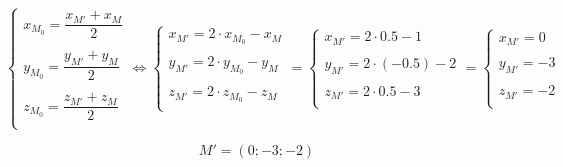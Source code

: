 $$
\begin{cases}
  x_{M_0} = \dfrac{x_{M'}+x_M}{2} \\
  \\
  y_{M_0} = \dfrac{y_{M'}+y_M}{2} \\
  \\
  z_{M_0} = \dfrac{z_{M'}+z_M}{2} \\
\end{cases} \iff
\begin{cases}
  x_{M'} = 2 \cdot x_{M_0} - x_M \\
  \\
  y_{M'} = 2 \cdot y_{M_0} - y_M \\
  \\
  z_{M'} = 2 \cdot z_{M_0} - z_M \\
\end{cases} =
\begin{cases}
  x_{M'} = 2 \cdot 0.5 - 1 \\
  \\
  y_{M'} = 2 \cdot (-0.5) - 2 \\
  \\
  z_{M'} = 2 \cdot 0.5 - 3 \\
\end{cases}=
\begin{cases}
  x_{M'} = 0 \\
  \\
  y_{M'} = -3 \\
  \\
  z_{M'} = -2 \\
\end{cases}
$$

$$
\boxed{M'=(0;-3;-2)}
$$
